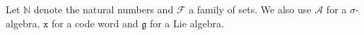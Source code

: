 Let $\mathbb{N}$ denote the natural numbers and $\mathcal{F}$ a family of sets.
We also use $\mathscr{A}$ for a $\sigma$-algebra, $\mathtt{x}$ for a code word and $\mathfrak{g}$ for a Lie algebra.